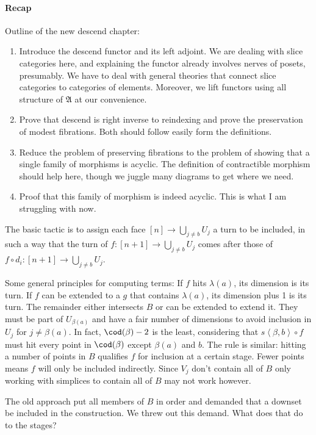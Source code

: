 \documentclass{tac}
\newcommand\tuplet[1]{\left\langle #1 \right\rangle}
\newcommand\ambient{\mathfrak A}
\begin{document}
\paragraph{Recap}
Outline of the new descend chapter:
\begin{enumerate}
\item Introduce the descend functor and its left adjoint.
We are dealing with slice categories here, and explaining the functor
already involves nerves of posets, presumably. We have to deal with general theories that connect slice categories to categories of elements. Moreover, we lift functors using all structure of $\ambient$ at our convenience.
\item Prove that descend is right inverse to reindexing and prove the preservation of modest fibrations.
Both should follow easily form the definitions.
\item Reduce the problem of preserving fibrations to the problem of showing that a single family of morphisms is acyclic.
The definition of contractible morphism should help here, though we juggle many diagrams to get where we need.
\item Proof that this family of morphism is indeed acyclic.
This is what I am struggling with now.
\end{enumerate}

The basic tactic is to assign each face $[n]\to\bigcup_{j\neq b}U_j$ a turn to be included, in such a way that the turn of $f:[n + 1]\to\bigcup_{j\neq b}U_j$ comes after those of $f\circ d_i:[n + 1]\to\bigcup_{j\neq b}U_j$.

Some general principles for computing terms: 
If $f$ hits $\lambda(a)$, its dimension is its turn.
If $f$ can be extended to a $g$ that contains $\lambda(a)$, its dimension plus 1 is its turn.
The remainder either intersects $B$ or can be extended to extend it. They must be part of $U_{\beta(a)}$ and have a fair number of dimensions to avoid inclusion in $U_j$ for $j\neq \beta(a)$. In fact, $\cod(\beta) - 2$ is the least, considering that $s\tuplet{\beta,b}\circ f$ must hit every point in $\cod(\beta)$ except $\beta(a)$ and $b$.
The rule is similar: hitting a number of points in $B$ qualifies $f$ for inclusion at a certain stage. Fewer points means $f$ will only be included indirectly. Since $V_j$ don't contain all of $B$ only working with simplices to contain all of $B$ may not work however.

The old approach put all members of $B$ in order and demanded that a downset be included in the construction. We threw out this demand. What does that do to the stages?
\end{document}
